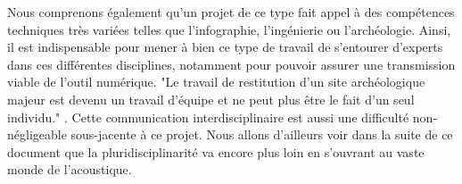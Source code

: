 Nous comprenons également qu'un projet de ce type fait appel à des compétences techniques très variées telles que l'infographie, l'ingénierie ou l'archéologie. Ainsi, il est indispensable pour mener à bien ce type de travail de s'entourer d'experts dans ces différentes disciplines, notamment pour pouvoir assurer une transmission viable de l'outil numérique. "Le travail de restitution d’un site archéologique majeur est devenu un travail d’équipe et ne peut plus être le fait d’un seul individu." \cite[p. 158]{archeogrid}. Cette communication interdisciplinaire est aussi une difficulté non-négligeable sous-jacente à ce projet. Nous allons d'ailleurs voir dans la suite de ce document que la pluridisciplinarité va encore plus loin en s'ouvrant au vaste monde de l'acoustique. 
	
	
			
 
 


